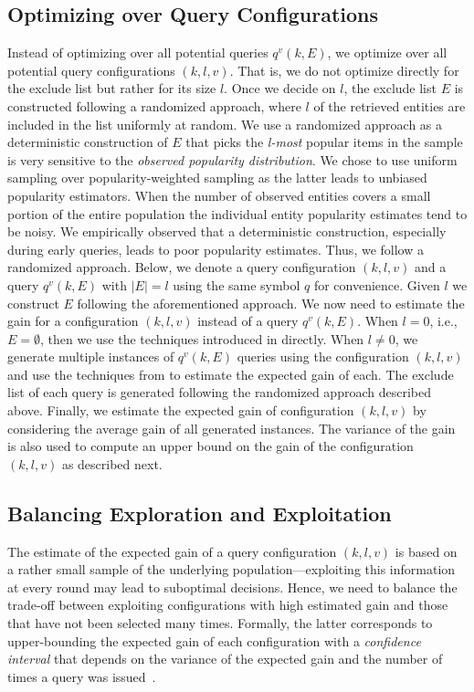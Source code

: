 \subsection{Optimizing over Query Configurations}
\label{sec:config}
Instead of optimizing over all potential queries $q^v(k,E)$, we optimize over all potential query configurations $(k,l,v)$. That is, we do not optimize directly for the exclude list but rather for its size $l$. Once we decide on $l$, the exclude list $E$ is constructed following a randomized approach, where $l$ of the retrieved entities are included in the list uniformly at random. 
\iftr
We use a randomized approach as a deterministic construction of $E$ that picks the {\em l-most} popular items in the sample is very sensitive to the {\em observed popularity distribution}. We chose to use uniform sampling over popularity-weighted sampling as the latter leads to unbiased popularity estimators. When the number of observed entities covers a small portion of the entire population the individual entity popularity estimates tend to be noisy. We empirically observed that a deterministic construction, especially during early queries, leads to poor popularity estimates. Thus, we follow a randomized approach. 
\fi
Below, we denote a query configuration $(k,l,v)$ and a query $q^v(k,E)$ with $|E| = l$ using the same symbol $q$ for convenience. 
\iftr
Given $l$ we construct $E$ following the aforementioned approach.
\fi
We now need to estimate the gain for a configuration $(k,l,v)$ instead of a query $q^v(k,E)$. When $l = 0$, i.e., $E = \emptyset$, then we use the techniques introduced in  directly. When $l \neq 0$, we generate multiple instances of $q^v(k,E)$ queries using the configuration $(k,l,v)$ and use the techniques from  to estimate the expected gain of each. The exclude list of each query is generated following the randomized approach described above. Finally, we estimate the expected gain of configuration $(k,l,v)$ by considering the average gain of all generated instances. The variance of the gain is also used to compute an upper bound on the gain of the configuration $(k,l,v)$ as described next.

\subsection{Balancing Exploration and Exploitation}
\label{sec:balancing}
The estimate of the expected gain of a query configuration $(k,l,v)$ is based on a rather small sample of the underlying population---exploiting this information at every round may lead to suboptimal decisions. Hence, we need to balance the trade-off between exploiting configurations with high estimated gain and those that have not been selected many times. Formally, the latter corresponds to upper-bounding the expected gain of each configuration with a {\em confidence interval} that depends on the variance of the expected gain and the number of times a query was issued~\cite{Auer:2003}.

